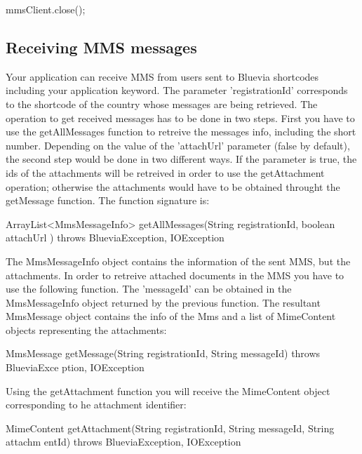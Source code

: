 \begin{DoxyCode}
mmsClient.close();
\end{DoxyCode}
\hypertarget{blv_mms_mo_guide_receiving_mmsmessages}{}\subsection{Receiving MMS messages}\label{blv_mms_mo_guide_receiving_mmsmessages}
Your application can receive MMS from users sent to Bluevia shortcodes including your application keyword. The parameter 'registrationId' corresponds to the shortcode of the country whose messages are being retrieved. The operation to get received messages has to be done in two steps. First you have to use the getAllMessages function to retreive the messages info, including the short number. Depending on the value of the 'attachUrl' parameter (false by default), the second step would be done in two different ways. If the parameter is true, the ids of the attachments will be retreived in order to use the getAttachment operation; otherwise the attachments would have to be obtained throught the getMessage function. The function signature is:


\begin{DoxyCode}
ArrayList<MmsMessageInfo> getAllMessages(String registrationId, boolean attachUrl
      ) throws BlueviaException, IOException
\end{DoxyCode}


The MmsMessageInfo object contains the information of the sent MMS, but the attachments. In order to retreive attached documents in the MMS you have to use the following function. The 'messageId' can be obtained in the MmsMessageInfo object returned by the previous function. The resultant MmsMessage object contains the info of the Mms and a list of MimeContent objects representing the attachments:


\begin{DoxyCode}
MmsMessage getMessage(String registrationId, String messageId) throws BlueviaExce
      ption, IOException
\end{DoxyCode}


Using the getAttachment function you will receive the MimeContent object corresponding to he attachment identifier:


\begin{DoxyCode}
MimeContent getAttachment(String registrationId, String messageId, String attachm
      entId) throws BlueviaException, IOException
\end{DoxyCode}


